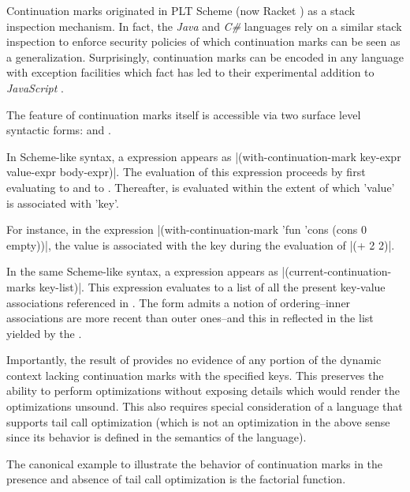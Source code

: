 \documentclass[ms,electronic,twosidetoc,letterpaper,chaptercenter,parttop]{byumsphd}
\begin{document}
Continuation marks originated in PLT Scheme (now Racket \cite{plt-tr1}) as a stack 
inspection mechanism. In fact, the \emph{Java} and \emph{C\#} languages rely on a similar 
stack inspection to enforce security policies of which continuation marks can be seen as 
a generalization. Surprisingly, continuation marks can be encoded in any language with 
exception facilities \cite{pettyjohn2005continuations} which fact has led to their 
experimental addition to \emph{JavaScript} \cite{clements2008implementing}.

The feature of continuation marks itself is accessible via two surface level syntactic
forms:  and .

In Scheme-like syntax, a  expression appears as
\scheme|(with-continuation-mark key-expr value-expr body-expr)|. The evaluation of this
expression proceeds by first evaluating  to  and
 to . Thereafter,  is evaluated within
the extent of which \scheme'value' is associated with \scheme 'key'.

For instance, in the expression \scheme|(with-continuation-mark 'fun 'cons (cons 0
empty))|, the value  is associated with the key  during the
evaluation of \scheme|(+ 2 2)|.

In the same Scheme-like syntax, a  expression appears
as \scheme|(current-continuation-marks key-list)|. This expression evaluates to a list of
all the present key-value associations referenced in . The
 form admits a notion of ordering--inner associations are
more recent than outer ones--and this in reflected in the list yielded by the
.

Importantly, the result of  provides no evidence of any
portion of the dynamic context lacking continuation marks with the specified keys. This
preserves the ability to perform optimizations without exposing details which would render
the optimizations unsound. This also requires special consideration of a language that
supports tail call optimization (which is not an optimization in the above sense since its
behavior is defined in the semantics of the language).

The canonical example to illustrate the behavior of continuation marks in the presence and
absence of tail call optimization is the factorial function.
\end{document}

